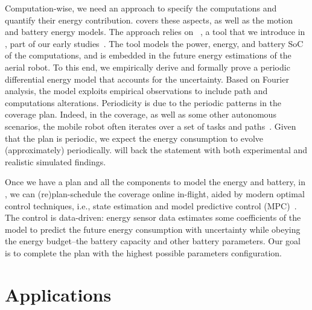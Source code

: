 Computation-wise, we need an approach to specify the computations and quantify their energy contribution.  covers these aspects, as well as the motion and battery energy models. The approach relies on \powprof{}~\citep{powprofiler}, a tool that we introduce in , part of our early studies~\citep{seewald2019component,seewald2019coarse}. The tool models the power, energy, and battery SoC of the computations, and is embedded in the future energy estimations of the aerial robot. To this end, we empirically derive and formally prove a periodic differential energy model that accounts for the uncertainty. Based on Fourier analysis, the model exploits empirical observations to include path and computations alterations. Periodicity is due to the periodic patterns in the coverage plan. Indeed, in the coverage, as well as some other autonomous scenarios, the mobile robot often iterates over a set of tasks and paths~\citep{seewald2020mechanical,seewald202Xenergy}. Given that the plan is periodic, we expect the energy consumption to evolve (approximately) periodically.  will back the statement with both experimental and realistic simulated findings.

Once we have a plan and all the components to model the energy and battery, in , we can (re)plan-schedule the coverage online in-flight, aided by modern optimal control techniques, i.e., state estimation and model predictive control (MPC)~\citep{rawlings2017model,simon2006optimal}. The control is data-driven: energy sensor data estimates some coefficients of the model to predict the future energy consumption with uncertainty while obeying the energy budget--the battery capacity and other battery parameters. Our goal is to complete the plan with the highest possible parameters configuration.


\section{Applications}
\label{sec:applics}

